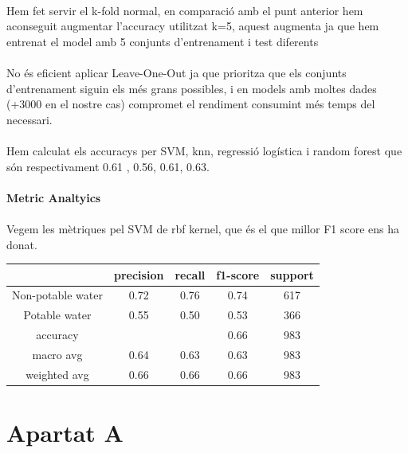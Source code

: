 \documentclass{article}
\begin{document}
	\\
	Hem fet servir el k-fold normal, en comparació amb el punt anterior hem aconseguit augmentar l'accuracy utilitzat k=5, aquest augmenta ja que hem entrenat el model amb 5 conjunts d'entrenament i test diferents\\
	\\
	No és eficient aplicar Leave-One-Out ja que prioritza que els conjunts d'entrenament siguin els més grans possibles, i en models amb moltes dades (+3000 en el nostre cas) compromet el rendiment consumint més temps del necessari.\\
	\\
	Hem calculat els accuracys per SVM, knn, regressió logística i random forest que són respectivament 0.61 , 0.56, 0.61, 0.63.\\ 
	\\
	\textbf{Metric Analtyics}\\
	\\
	Vegem les mètriques pel SVM de rbf kernel, que és el que millor F1 score ens ha donat.\\
	\begin{center}
		\begin{tabular}{|c|c|c|c|c|}\hline
			&precision  &  recall & f1-score  & support\\ \hline
			
			Non-potable water   &    0.72 &     0.76 &     0.74 &      617\\ \hline
			Potable water    &   0.55    &  0.50     & 0.53      & 366\\ \hline
			
			accuracy       &     &          &     0.66     &  983\\ \hline
			macro avg       &0.64  &    0.63   &   0.63      & 983\\ \hline
			weighted avg     &  0.66 &     0.66  &    0.66    &   983\\ \hline
		\end{tabular}
	\end{center}
	
	

	
	\section*{Apartat A}

	
	
\end{document}
